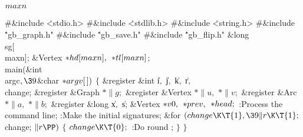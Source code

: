 \Y\B\4\D$\\{maxn}$ \5
\par
\Y\B\8\#\&{include} \.{<stdio.h>}\6
\8\#\&{include} \.{<stdlib.h>}\6
\8\#\&{include} \.{<string.h>}\6
\8\#\&{include} \.{"gb\_graph.h"}\6
\8\#\&{include} \.{"gb\_save.h"}\6
\8\#\&{include} \.{"gb\_flip.h"}\6
\&{long} \\{sg}[\\{maxn}];\6
\&{Vertex} ${}{*}\\{hd}[\\{maxn}],{}$ ${}{*}\\{tl}[\\{maxn}]{}$;\7
\\{main}(\&{int} \\{argc}${},\39{}$\&{char} ${}{*}\\{argv}[\,]){}$\1\1\2\2\6
${}\{{}$\1\6
\&{register} \&{int} \|i${},{}$ \|j${},{}$ \|k${},{}$ \|r${},{}$ \\{change};\6
\&{register} \&{Graph} ${}{*}\|g;{}$\6
\&{register} \&{Vertex} ${}{*}\|u,{}$ ${}{*}\|v;{}$\6
\&{register} \&{Arc} ${}{*}\|a,{}$ ${}{*}\|b;{}$\6
\&{register} \&{long} \|x${},{}$ \|s;\6
\&{Vertex} ${}{*}\\{v0},{}$ ${}{*}\\{prev},{}$ ${}{*}\\{head};{}$\7
:Process the command line\X;\6
:Make the initial signatures\X;\6
\&{for} ${}(\\{change}\K\T{1},\39\|r\K\T{1};{}$ \\{change}; ${}\|r\PP){}$\5
${}\{{}$\1\6
${}\\{change}\K\T{0};{}$\6
:Do round \X;\6
\4${}\}{}$\2\6
\4${}\}{}$\2\par
\fi

